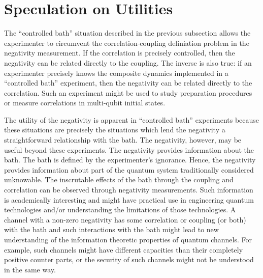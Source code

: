 \section{Speculation on Utilities}

The ``controlled bath'' situation described in the previous subsection allows the experimenter to circumvent the correlation-coupling deliniation problem in the negativity measurement.  If the correlation is precisely controlled, then the negativity can be related directly to the coupling.  The inverse is also true: if an experimenter precisely knows the composite dynamics implemented in a ``controlled bath'' experiment, then the negativity can be related directly to the correlation.  Such an experiment might be used to study preparation procedures or measure correlations in multi-qubit initial states.  

The utility of the negativity is apparent in ``controlled bath'' experiments because these situations are precisely the situations which lend the negativity a straightforward relationship with the bath.  The negativity, however, may be useful beyond these experiments.  The negativity provides information about the bath.  The bath is defined by the experimenter's ignorance.  Hence, the negativity provides information about part of the quantum system traditionally considered unknowable.  The inscrutable effects of the bath through the coupling and correlation can be observed through negativity measurements.  Such information is academically interesting and might have practical use in engineering quantum technologies and/or understanding the limitations of those technologies.  A channel with a non-zero negativity has some correlation or coupling (or both) with the bath and such interactions with the bath might lead to new understanding of the information theoretic properties of quantum channels.  For example, such channels might have different capacities than their completely positive counter parts, or the security of such channels might not be understood in the same way.


